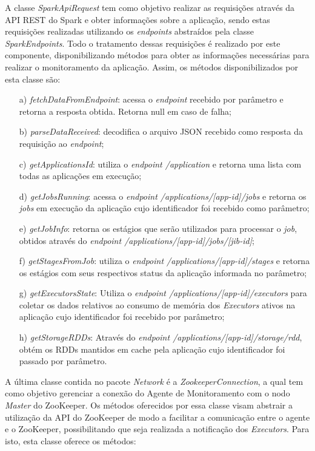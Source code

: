 A classe \textit{SparkApiRequest} tem como objetivo realizar as requisições através da API REST do Spark e obter informações sobre a aplicação, sendo estas requisições realizadas utilizando os \textit{endpoints} abstraídos pela classe \textit{SparkEndpoints}. Todo o tratamento dessas requisições é realizado por este componente, disponibilizando métodos para obter as informações necessárias para realizar o monitoramento da aplicação. Assim, os métodos disponibilizados por esta classe são:

\begin{enumerate}
    \item[a)] \textit{fetchDataFromEndpoint}: acessa o \textit{endpoint} recebido por parâmetro e retorna a resposta obtida. Retorna null em caso de falha;
    \item[b)] \textit{parseDataReceived}: decodifica o arquivo JSON recebido como resposta da requisição ao \textit{endpoint};
    \item[c)] \textit{getApplicationsId}: utiliza o \textit{endpoint /application} e retorna uma lista com todas as aplicações em execução;
    \item[d)] \textit{getJobsRunning}: acessa o \textit{endpoint /applications/{[}app-id{]}/jobs} e retorna os \textit{jobs} em execução da aplicação cujo identificador foi recebido como parâmetro;
    \item[e)] \textit{getJobInfo}: retorna os estágios que serão utilizados
    para processar o \textit{job}, obtidos através do \textit{endpoint /applications/{[}app-id{]}/jobs/{[}jib-id{]}};
    \item[f)] \textit{getStagesFromJob}: utiliza o \textit{endpoint /applications/{[}app-id{]}/stages} e retorna os estágios com seus respectivos status da aplicação informada no parâmetro;
    \item[g)] \textit{getExecutorsState}: Utiliza o \textit{endpoint /applications/{[}app-id{]}/executors} para coletar os dados relativos ao consumo de memória dos \textit{Executors} ativos na aplicação cujo identificador foi recebido por parâmetro;
    \item[h)] \textit{getStorageRDDs}: Através do \textit{endpoint /applications/{[}app-id{]}/storage/rdd}, obtém os RDDs mantidos em cache pela aplicação cujo identificador foi passado por parâmetro.
\end{enumerate}

A última classe contida no pacote \textit{Network} é a \textit{ZookeeperConnection}, a qual tem como objetivo gerenciar a conexão do Agente de Monitoramento com o nodo \textit{Master} do ZooKeeper. Os métodos oferecidos por essa classe visam abstrair a utilização da API do ZooKeeper de modo a facilitar a comunicação entre o agente e o ZooKeeper, possibilitando que seja realizada a notificação dos \textit{Executors}. Para isto, esta classe oferece os métodos:

